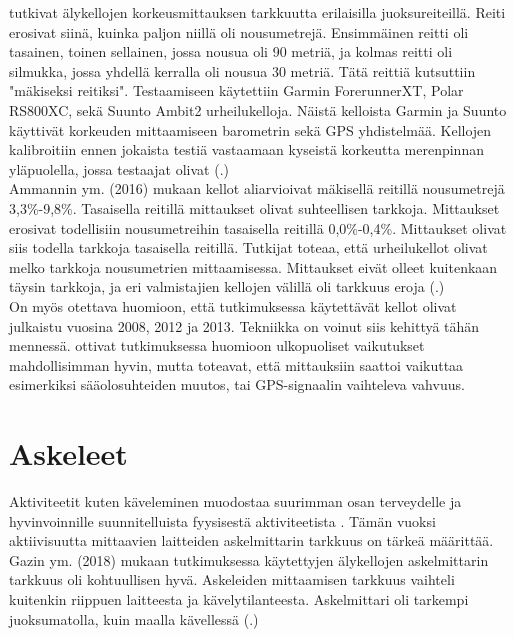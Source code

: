 \documentclass[utf8,bachelor,finnish]{bachelor}
\begin{document}
    \textcite{ammann_accuracy_2016} tutkivat älykellojen korkeusmittauksen tarkkuutta erilaisilla juoksureiteillä. Reiti erosivat siinä, kuinka paljon niillä oli nousumetrejä.
     Ensimmäinen reitti oli tasainen, toinen sellainen, jossa nousua oli 90 metriä, ja kolmas reitti oli silmukka, jossa yhdellä kerralla oli nousua 30 metriä.
      Tätä reittiä kutsuttiin "mäkiseksi reitiksi".
       Testaamiseen käytettiin Garmin ForerunnerXT, Polar RS800XC, sekä Suunto Ambit2 urheilukelloja. Näistä kelloista Garmin ja
        Suunto käyttivät korkeuden mittaamiseen barometrin sekä GPS yhdistelmää.
         Kellojen kalibroitiin ennen jokaista testiä vastaamaan kyseistä korkeutta merenpinnan yläpuolella, jossa testaajat olivat (\cite{ammann_accuracy_2016}.)\\

    Ammannin ym. (2016) mukaan kellot aliarvioivat mäkisellä reitillä nousumetrejä 3,3\%-9,8\%. Tasaisella reitillä mittaukset olivat suhteellisen tarkkoja.
     Mittaukset erosivat todellisiin nousumetreihin tasaisella reitillä 0,0\%-0,4\%. Mittaukset olivat siis todella tarkkoja tasaisella reitillä.
      Tutkijat toteaa, että urheilukellot olivat melko tarkkoja nousumetrien mittaamisessa. Mittaukset eivät olleet kuitenkaan
       täysin tarkkoja, ja eri valmistajien kellojen välillä oli tarkkuus eroja (\cite{ammann_accuracy_2016}.)\\
       
    On myös otettava huomioon, että tutkimuksessa käytettävät kellot olivat julkaistu vuosina 2008, 2012 ja 2013. Tekniikka on voinut siis kehittyä tähän mennessä. 
     \textcite{ammann_accuracy_2016} ottivat tutkimuksessa huomioon ulkopuoliset vaikutukset mahdollisimman hyvin, mutta toteavat, että mittauksiin
      saattoi vaikuttaa esimerkiksi sääolosuhteiden muutos, tai GPS-signaalin vaihteleva vahvuus.\\

  \section{Askeleet}
  Aktiviteetit kuten käveleminen muodostaa suurimman osan terveydelle ja hyvinvoinnille suunnitelluista fyysisestä aktiviteetista \parencite{gaz_determining_2018}.
   Tämän vuoksi aktiivisuutta mittaavien laitteiden askelmittarin tarkkuus on tärkeä määrittää.
    Gazin ym. (2018) mukaan tutkimuksessa käytettyjen älykellojen askelmittarin tarkkuus oli kohtuullisen hyvä. Askeleiden mittaamisen tarkkuus
     vaihteli kuitenkin riippuen laitteesta ja kävelytilanteesta. Askelmittari oli tarkempi juoksumatolla, kuin
      maalla kävellessä (\cite{gaz_determining_2018}.)\\
  
\end{document}
